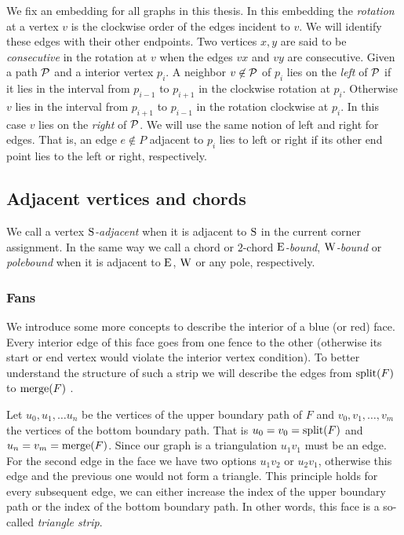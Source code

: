   We fix an embedding for all graphs in this thesis. In this embedding the \emph{rotation} at a vertex $v$ is the clockwise order of the edges incident to $v$. We will identify these edges with their other endpoints.
  Two vertices $x, y$ are said to be \emph{consecutive} in the rotation at $v$ when the edges $vx$ and $vy$ are consecutive.
  Given a path $\P$ and a interior vertex $p_i$. A neighbor $v \nin \P$ of $p_i$ lies on the \emph{left} of $\P$ if it lies in the interval from $p_{i-1}$ to $p_{i+1}$ in the clockwise rotation at $p_{i}$. Otherwise $v$ lies in the interval from $p_{i+1}$ to $p_{i-1}$ in the rotation clockwise at $p_i$. In this case $v$ lies on the \emph{right} of $\P$.
  We will use the same notion of left and right for edges. That is, an edge $e\nin P$ adjacent to $p_i$ lies to left or right if its other end point lies to the left or right, respectively.



    \subsection{Adjacent vertices and chords}
    We call a vertex \emph{$\pS$-adjacent} when it is adjacent to $\pS$ in the current corner assignment. In the same way we call a chord or $2$-chord \emph{$\pE$-bound}, \emph{$\pW$-bound} or \emph{polebound} when it is adjacent to $\pE$, $\pW$ or any pole,  respectively.

    \subsubsection{Fans}
    We introduce some more concepts to describe the interior of a blue (or red) face. Every interior edge of this face goes from one fence to the other (otherwise its start or end vertex would violate the interior vertex condition). To better understand the structure of such a strip we will describe the edges from $\spl(F)$ to $\mrg(F)$ .

    Let $u_0 , u_1, \ldots u_n$ be the vertices of the upper boundary path of $F$ and $v_0, v_1, \ldots, v_m$ the vertices of the bottom boundary path. That is $u_0=v_0 = \spl(F)$ and $u_n = v_m = \mrg(F)$. Since our graph is a triangulation $u_1v_1$ must be an edge. For the second edge in the face we have two options $u_1v_2$ or $u_2v_1$, otherwise this edge and the previous one would not form a triangle. This principle holds for every subsequent edge, we can either increase the index of the upper boundary path or the index of the bottom boundary path. In other words, this face is a so-called \emph{triangle strip}.

